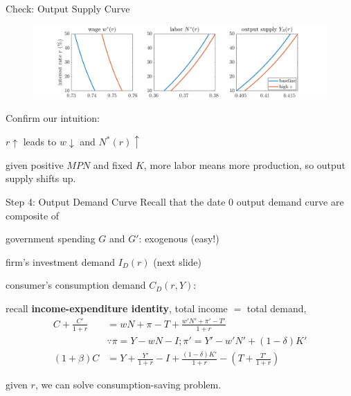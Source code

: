 \documentclass[11pt,aspectratio=169,usenames,dvipsnames]{beamer}
\let\tempone\itemize
\let\temptwo\enditemize
\renewenvironment{itemize}{\tempone\addtolength{\itemsep}{\fill}}{\temptwo}
\begin{document}
\begin{frame}{Check: Output Supply Curve}
\label{slide:Check__Output_Supply_Curve}
    \begin{figure}
        \includegraphics[width=\textwidth]{./figures/OutputSupply.png}
    \end{figure}
    Confirm our intuition:
    \begin{itemize}
        \item $ r \uparrow  $ leads to $ w \downarrow  $ and $ N^{*}( r ) \uparrow  $
        \item given positive $ MPN $ and fixed $ K $, more labor means more production, so output supply shifts up.
    \end{itemize}
\end{frame}

\begin{frame}{Step 4: Output Demand Curve}
\label{slide:Step_4__Output_Demand_Curve}
    Recall that the date 0 output demand curve are composite of
    \begin{itemize}
        \item government spending $ G $ and $ G' $: exogenous (easy!)
        \item firm's investment demand $ I_{D}( r ) $ (next slide)
        \item consumer's consumption demand $ C_{D}( r, Y ) $:
        \begin{itemize}
            \item recall \textbf{income-expenditure identity}, total income $ = $ total demand,
            \begin{align*}
                C + \frac{C'}{1+r}
                    &  = wN + \pi - T + \frac{w' N' + \pi' - T'}{1+r}
                \\
                    & \because \pi = Y - wN - I; \pi' = Y' - w'N' + ( 1-\delta )K'
                \\
                ( 1+\beta ) C
                    & = Y + \frac{Y'}{1+r} - I + \frac{( 1-\delta )K'}{1+r} - \left( T + \frac{T'}{1+r} \right)
            \end{align*}
            \item given $ r $, we can solve consumption-saving problem.
        \end{itemize}
    \end{itemize}
\end{frame}
\end{document}
